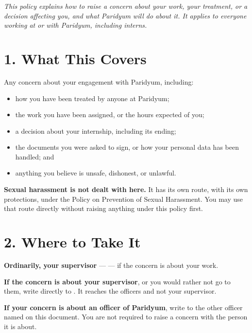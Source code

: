 \documentclass{paridyum}
\begin{document}
\paridyumletterhead
\paridyumdateref{\dkDocDate}{\dkDocRef}

\textit{This policy explains how to raise a concern about your work, your
treatment, or a decision affecting you, and what Paridyum will do about it. It
applies to everyone working at or with Paridyum, including interns.}

\section*{1. What This Covers}
Any concern about your engagement with Paridyum, including:
\begin{itemize}[leftmargin=*, noitemsep]
    \item how you have been treated by anyone at Paridyum;
    \item the work you have been assigned, or the hours expected of you;
    \item a decision about your internship, including its ending;
    \item the documents you were asked to sign, or how your personal data has
          been handled; and
    \item anything you believe is unsafe, dishonest, or unlawful.
\end{itemize}

\textbf{Sexual harassment is not dealt with here.} It has its own route, with
its own protections, under the Policy on Prevention of Sexual Harassment. You
may use that route directly without raising anything under this policy first.

\section*{2. Where to Take It}
\begin{infobox}
\textbf{Ordinarily, your supervisor} --- \dkPEngagementSupervisor{} --- if the
concern is about your work.

\vspace{0.5em}
\textbf{If the concern is about your supervisor}, or you would rather not go to
them, write directly to \textbf{\dkOrgEmail}. It reaches the officers and not
your supervisor.

\vspace{0.5em}
\textbf{If your concern is about an officer of Paridyum}, write to the other
officer named on this document. You are not required to raise a concern with
the person it is about.
\end{infobox}
\end{document}
